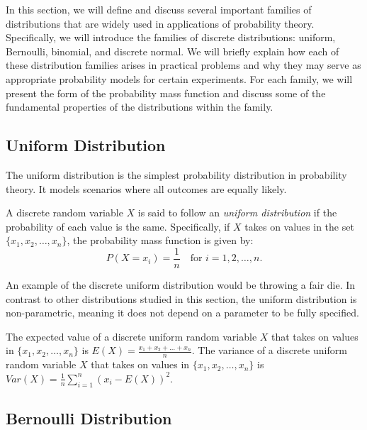 In this section, we will define and discuss several important families of distributions that are widely used in applications of probability theory. Specifically, we will introduce the families of discrete distributions: uniform, Bernoulli, binomial, and discrete normal. We will briefly explain how each of these distribution families arises in practical problems and why they may serve as appropriate probability models for certain experiments. For each family, we will present the form of the probability mass function and discuss some of the fundamental properties of the distributions within the family. 

%
%

\subsection{Uniform Distribution}

The uniform distribution is the simplest probability distribution in probability theory. It models scenarios where all outcomes are equally likely.

\begin{definition}
A discrete random variable $X$ is said to follow an \emph{uniform distribution} if the probability of each value is the same. Specifically, if $X$ takes on values in the set $\{x_1, x_2, \ldots, x_n\}$, the probability mass function is given by:
\[
P(X = x_i) = \frac{1}{n} \quad \text{for } i = 1, 2, \ldots, n.
\]
\end{definition}

An example of the discrete uniform distribution would be throwing a fair die. In contrast to other distributions studied in this section, the uniform distribution is non-parametric, meaning it does not depend on a parameter to be fully specified.

The expected value of a discrete uniform random variable $X$ that takes on values in $\{x_1, x_2, \ldots, x_n\}$ is $E(X) = \frac{x_1 + x_2 + \ldots + x_n}{n}$. The variance of a discrete uniform random variable $X$ that takes on values in $\{x_1, x_2, \ldots, x_n\}$ is $Var(X) = \frac{1}{n} \sum_{i=1}^n (x_i - E(X))^2$.

%
%

\subsection{Bernoulli Distribution}

